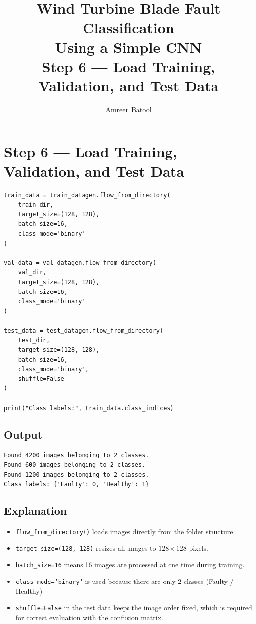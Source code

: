 \documentclass[12pt]{article}
\title{\textbf{Wind Turbine Blade Fault Classification\\Using a Simple CNN}\\[0.5em]
\large Step 6 --- Load Training, Validation, and Test Data}
\author{Amreen Batool}
\date{}
\begin{document}
\maketitle

\section*{Step 6 --- Load Training, Validation, and Test Data}

\begin{lstlisting}[style=pythonstyle]
train_data = train_datagen.flow_from_directory(
    train_dir,
    target_size=(128, 128),
    batch_size=16,
    class_mode='binary'
)

val_data = val_datagen.flow_from_directory(
    val_dir,
    target_size=(128, 128),
    batch_size=16,
    class_mode='binary'
)

test_data = test_datagen.flow_from_directory(
    test_dir,
    target_size=(128, 128),
    batch_size=16,
    class_mode='binary',
    shuffle=False
)

print("Class labels:", train_data.class_indices)
\end{lstlisting}

\subsection*{Output}

\begin{lstlisting}[style=outputstyle]
Found 4200 images belonging to 2 classes.
Found 600 images belonging to 2 classes.
Found 1200 images belonging to 2 classes.
Class labels: {'Faulty': 0, 'Healthy': 1}
\end{lstlisting}

\subsection*{Explanation}

\begin{itemize}
    \item \texttt{flow\_from\_directory()} loads images directly from the folder structure.
    \item \texttt{target\_size=(128, 128)} resizes all images to $128 \times 128$ pixels.
    \item \texttt{batch\_size=16} means 16 images are processed at one time during training.
    \item \texttt{class\_mode='binary'} is used because there are only 2 classes (Faulty / Healthy).
    \item \texttt{shuffle=False} in the test data keeps the image order fixed, which is required for correct evaluation with the confusion matrix.
\end{itemize}
\end{document}
